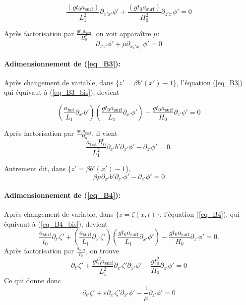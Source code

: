 \documentclass[12pt,a4paper]{article}
\numberwithin{equation}{section}
\begin{document}
\begin{equation*}
    \frac{(g t_0 a_{\text{surf}})}{L_1^2}\partial_{x' x'}\phi'+ \frac{(g t_0 a_{\text{surf}})}{H_0^2}\partial_{z' z'}\phi'  = 0
\end{equation*}

Après factorisation par $ \frac{g t_0 a_{\text{surf}} }{H_0^2}$, on voit apparaître $\mu$:
\begin{equation}
    \partial_{z'z'}\phi' + \mu \partial_{x_1' x_1'}\phi'  = 0 \label{eq_B2_adim}
\end{equation}



\paragraph{Adimensionnement de (\ref{eq_B3}):} Après changement de variable, dans $\{z' = \beta b'(x') - 1\}$, l'équation (\ref{eq_B3}) qui équivaut à  (\ref{eq_B3_bis}), devient

\begin{equation*}
    \left(\frac{a_{\text{bot}}}{L_1} \partial_{x'} b'\right)\left(\frac{gt_0a_{\text{surf}}}{L_1}\partial_{x'}\phi'\right)  - \frac{gt_0a_{\text{surf}}}{H_0}\partial_{z'}\phi' = 0 
\end{equation*}

Après factorisation par $\frac{g t_0 a_{\text{surf}}}{H_0} $, il vient
\begin{equation*}
    \frac{a_{\text{bot}}H_0}{L_1^2}  \partial_{x'} b' \partial_{x'}\phi'  - \partial_{z'}\phi' = 0 .
\end{equation*}

Autrement dit, dans $\{z' = \beta b'(x') - 1\}$, 
\begin{equation}
    \beta \mu \partial_{x'} b'  \partial_{x'}\phi'   - \partial_{z'}\phi' = 0 \label{eq_B3_adim}
\end{equation}

\paragraph{Adimensionnement de (\ref{eq_B4}):} Après changement de variable, dans $\{z = \zeta(x,t)\}$, l'équation (\ref{eq_B4}), qui équivaut à  (\ref{eq_B4_bis}), devient
\begin{equation*}
    \frac{a_{\text{surf}}}{t_0}\partial_{t'} \zeta' + \left(\frac{a_{\text{surf}}}{L_1} \partial_{x'} \zeta '\right)\left(\frac{gt_0a_{\text{surf}}}{L_1}\partial_{x'}\phi'\right)  - \frac{gt_0a_{\text{surf}}}{H_0}\partial_{z'}\phi' = 0 .
\end{equation*}
Après factorisation par $ \frac{a_{\text{surf}} }{t_0}$, on trouve
\begin{equation*}
     \partial_{t'}\zeta' +  \frac{gt_0^2a_{\text{surf}}}{L_1^2} \partial_{x'} \zeta ' \partial_{x'}\phi'  - \frac{gt_0^2}{H_0}\partial_{z'}\phi' = 0
\end{equation*}
Ce qui donne donc 
\begin{equation}
    \partial_{t'}\zeta' +  \varepsilon \partial_{x'} \zeta ' \partial_{x'}\phi'  - \frac{1}{\mu}\partial_{z'}\phi' = 0\label{eq_B4_adim}
\end{equation}
\end{document}
